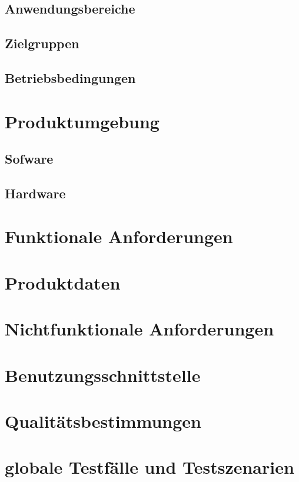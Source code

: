 \documentclass[parskip=full,11pt]{scrartcl}
\begin{document}
\subsection{Anwendungsbereiche}
\subsection{Zielgruppen}
\subsection{Betriebsbedingungen}


\section{Produktumgebung}
\subsection{Sofware}
\subsection{Hardware}


\section{Funktionale Anforderungen}


\section{Produktdaten}

\section{Nichtfunktionale Anforderungen}


\section{Benutzungsschnittstelle}

\section{Qualitätsbestimmungen}

\section{globale Testfälle und Testszenarien}

\newpage
\printglossary	
\end{document}
